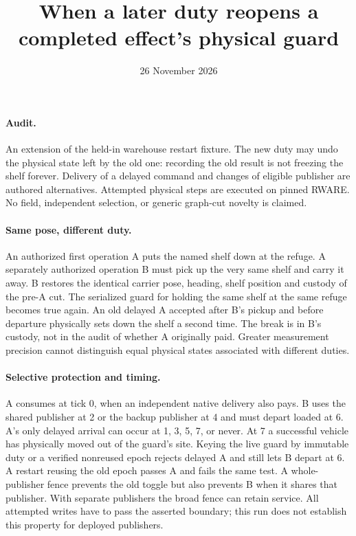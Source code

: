 \documentclass{article}
\title{When a later duty reopens a completed effect's physical guard}
\author{}
\date{26 November 2026}
\begin{document}
\maketitle
\paragraph{Audit.}
An extension of the held-in warehouse restart fixture. The new duty may
undo the physical state left by the old one: recording the old result is not
freezing the shelf forever. Delivery of a delayed command and changes of
eligible publisher are authored alternatives. Attempted physical steps are
executed on pinned RWARE. No field, independent selection, or generic
graph-cut novelty is claimed.

\paragraph{Same pose, different duty.}
An authorized first operation A puts the named shelf down at the refuge.
A separately authorized operation B must pick up the very same shelf and
carry it away. B restores the identical carrier pose, heading, shelf position
and custody of the pre-A cut. The serialized guard for holding the same
shelf at the same refuge becomes true again. An old delayed A accepted
after B's pickup and before departure physically sets down the shelf a
second time. The break is in B's custody, not in the audit of whether A
originally paid. Greater measurement precision cannot distinguish equal
physical states associated with different duties.

\paragraph{Selective protection and timing.}
A consumes at tick 0, when an independent native delivery also pays.
B uses the shared publisher at 2 or the backup publisher at 4 and must
depart loaded at 6. A's only delayed arrival can occur at 1, 3, 5, 7,
or never. At 7 a successful vehicle has physically moved out of the
guard's site. Keying the live guard by immutable duty or a verified
nonreused epoch rejects delayed A and still lets B depart at 6. A restart
reusing the old epoch passes A and fails the same test. A whole-publisher
fence prevents the old toggle but also prevents B when it shares that
publisher. With separate publishers the broad fence can retain service.
All attempted writes have to pass the asserted boundary; this run does
not establish this property for deployed publishers.
\end{document}
